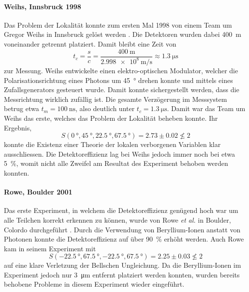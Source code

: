 \begin{refsection}
\paragraph{Weihs, Innsbruck 1998}
Das Problem der Lokalit\"at konnte zum ersten Mal 1998 von einem Team
um Gregor Weihs in Innsbruck gel\"ost werden \cite{Bell:Weihs1998}.
Die Detektoren wurden dabei \SI{400}{\meter} voneinander getrennt platziert.
Damit bleibt eine Zeit von
\[
    t_c = \frac{s}{c} = \frac{\SI{400}{\meter}}{\SI{2.998e8}{\meter\per\second}} \approx \SI{1.3}{\micro\second}
\]
zur Messung.
Weihs entwickelte einen elektro-optischen Modulator, welcher die 
Polarisationsrichtung eines Photons um \SI{45}{\degree} drehen konnte und
mittels eines Zufallsgenerators gesteuert wurde.
Damit konnte sichergestellt werden, dass die Messrichtung wirklich zuf\"allig
ist.
Die gesamte Verz\"ogerung im Messsystem betrug etwa 
$t_m = \SI{100}{\nano\second}$, also deutlich unter $t_c = \SI{1.3}{\micro\second}$. 
Damit war das Team um Weihs das erste, welches das Problem der Lokalit\"at
beheben konnte.
Ihr Ergebnis,
\[
    S(\SI{0}{\degree},\SI{45}{\degree},\SI{22.5}{\degree},\SI{67.5}{\degree})
    = 2.73 \pm 0.02 \nleqslant 2
\]
konnte die Existenz einer Theorie der lokalen verborgenen Variablen klar 
ausschliessen.
Die Detektoreffizienz lag bei Weihs jedoch immer noch bei etwa \SI{5}{\percent},
womit nicht alle Zweifel am Resultat des Experiment behoben werden konnten.

\paragraph{Rowe, Boulder 2001}
Das erste Experiment, in welchem die Detektoreffizienz gen\"ugend hoch war um
alle Teilchen korrekt erkennen zu k\"onnen, wurde von Rowe \textit{et al.}
in Boulder, Colordo durchgef\"uhrt \cite{Bell:Rowe2001}. 
Durch die Verwendung von Beryllium-Ionen anstatt von Photonen konnte die
Detektoreffizienz auf \"uber \SI{90}{\percent} erh\"oht werden.
Auch Rowe kam in seinem Experiment mit
\[
    S(\SI{-22.5}{\degree},\SI{67.5}{\degree},\SI{-22.5}{\degree},\SI{67.5}{\degree})
    = 2.25 \pm 0.03 \nleqslant 2
\]
auf eine klare Verletzung der Bellschen Ungleichung.
Da die Beryllium-Ionen im Experiment jedoch nur \SI{3}{\micro\meter}
entfernt platziert werden konnten, wurden bereits behobene Probleme in
diesem Experiment wieder eingef\"uhrt.


\end{refsection}
